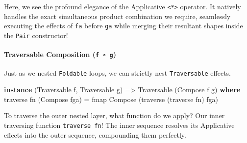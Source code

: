 \documentclass[
]{article}
\newenvironment{Shaded}{}{}
\newcommand{\CommentTok}[1]{\textcolor[rgb]{0.38,0.63,0.69}{\textit{#1}}}
\newcommand{\DataTypeTok}[1]{\textcolor[rgb]{0.56,0.13,0.00}{#1}}
\newcommand{\FunctionTok}[1]{\textcolor[rgb]{0.02,0.16,0.49}{#1}}
\newcommand{\KeywordTok}[1]{\textcolor[rgb]{0.00,0.44,0.13}{\textbf{#1}}}
\newcommand{\NormalTok}[1]{#1}
\newcommand{\OtherTok}[1]{\textcolor[rgb]{0.00,0.44,0.13}{#1}}
\begin{document}
\begin{Shaded}
\end{Shaded}

Here, we see the profound elegance of the Applicative
\texttt{\textless{}*\textgreater{}} operator. It natively handles the
exact simultaneous product combination we require, seamlessly executing
the effects of \texttt{fa} before \texttt{ga} while merging their
resultant shapes inside the \texttt{Pair} constructor!

\paragraph{\texorpdfstring{Traversable Composition
(\texttt{f\ ∘\ g})}{Traversable Composition (f ∘ g)}}\label{traversable-composition-f-g}

Just as we nested \texttt{Foldable} loops, we can strictly nest
\texttt{Traversable} effects.

\begin{Shaded}
\begin{Highlighting}[]
\KeywordTok{instance}\NormalTok{ (}\DataTypeTok{Traversable}\NormalTok{ f, }\DataTypeTok{Traversable}\NormalTok{ g) }\OtherTok{=\textgreater{}} \DataTypeTok{Traversable}\NormalTok{ (}\DataTypeTok{Compose}\NormalTok{ f g) }\KeywordTok{where}
    \FunctionTok{traverse}\NormalTok{ fn (}\DataTypeTok{Compose}\NormalTok{ fga) }\OtherTok{=} 
        \FunctionTok{fmap} \DataTypeTok{Compose}\NormalTok{ (}\FunctionTok{traverse}\NormalTok{ (}\FunctionTok{traverse}\NormalTok{ fn) fga)}
\end{Highlighting}
\end{Shaded}

To traverse the outer nested layer, what function do we apply? Our inner
traversing function \texttt{traverse\ fn}! The inner sequence resolves
its Applicative effects into the outer sequence, compounding them
perfectly.
\end{document}
